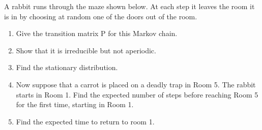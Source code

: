 \documentclass[
	12pt, %
]{fphw}
\begin{document}
\begin{problem}
	\smallskip
	A rabbit runs through the maze shown below. At each step it leaves
	the room it is in by choosing at random one of the doors out of the room.
	\begin{enumerate} 
		\item Give the transition matrix P for this Markov chain.
		\item Show that it is irreducible but not aperiodic.
		\item Find the stationary distribution.
		\item Now suppose that a carrot is placed on a deadly trap in Room
		5. The rabbit starts in Room 1. Find the expected number
		of steps before reaching Room 5 for the first time, starting in Room 1.
		\item Find the expected time to return to room 1.
	\end{enumerate}
	\smallskip
\end{problem}

\end{document}
